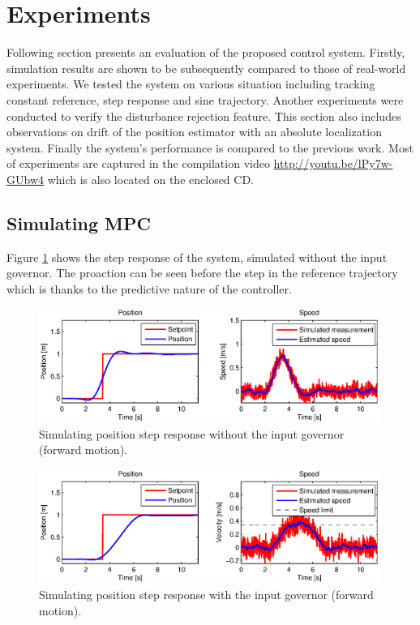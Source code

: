 \section{Experiments}
\label{cap:experiments}

Following section presents an evaluation of the proposed control system. Firstly, simulation results are shown to be subsequently compared to those of real-world experiments. We tested the system on various situation including tracking constant reference, step response and sine trajectory. Another experiments were conducted to verify the disturbance rejection feature. This section also includes observations on drift of the position estimator with an absolute localization system. Finally the system's performance is compared to the previous work. Most of experiments are captured in the compilation video \url{http://youtu.be/lPy7w-GUbw4} which is also located on the enclosed CD. 

\subsection{Simulating MPC}

Figure \ref{fig:simulation_step_no_governor} shows the step response of the system, simulated without the input governor. The proaction can be seen before the step in the reference trajectory which is thanks to the predictive nature of the controller. 

\begin{figure}[H]
\centering
\includegraphics[width=0.99\textwidth]{fig/simulation1_step_no_governor.eps}
\caption{Simulating position step response without the input governor (forward motion).}
\label{fig:simulation_step_no_governor}
\end{figure}

\begin{figure}[H]
\centering
\includegraphics[width=0.99\textwidth]{fig/simulation2_step_governor.eps}
\caption{Simulating position step response with the input governor (forward motion).}
\label{fig:simulation_step_governor}
\end{figure}

